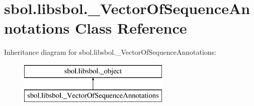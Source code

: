 \hypertarget{classsbol_1_1libsbol_1_1___vector_of_sequence_annotations}{}\section{sbol.\+libsbol.\+\_\+\+Vector\+Of\+Sequence\+Annotations Class Reference}
\label{classsbol_1_1libsbol_1_1___vector_of_sequence_annotations}
Inheritance diagram for sbol.\+libsbol.\+\_\+\+Vector\+Of\+Sequence\+Annotations\+:\begin{figure}[H]
\begin{center}
\leavevmode
\includegraphics[height=2.000000cm]{classsbol_1_1libsbol_1_1___vector_of_sequence_annotations}
\end{center}
\end{figure}
